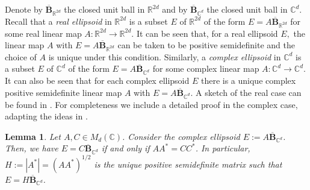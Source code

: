 \documentclass{article}
\newtheorem{lemma}[theorem]{Lemma}
\theoremstyle{definition}
\theoremstyle{remark}
\numberwithin{equation}{section}
\newcommand{\reals}{\mathbb{R}}
\newcommand{\complex}{\mathbb{C}}
\newcommand{\1}{\mathbf{1}}
\begin{document}
    Denote by $\mathbf{\overline{B}}_{\reals^{2d}}$ the closed unit ball in $\reals^{2d}$ and by $\mathbf{\overline{B}}_{\complex^{d}}$ the closed unit ball in $\complex^{d}.$
    Recall that a \emph{real ellipsoid} in $\reals^{2d}$ is a subset $E$ of $\reals^{2d}$ of the form $E=A\mathbf{\overline{B}}_{\reals^{2d}}$ for some real linear map $A:\reals^{2d}\to\reals^{2d}$.
    It can be seen that, for a real ellipsoid $E,$ the linear map $A$ with $E=A\mathbf{\overline{B}}_{\reals^{2d}}$ can be taken to be positive semidefinite and the choice of $A$ is unique under this condition.  Similarly, a \emph{complex ellipsoid} in $\complex^{d}$ is a subset $E$ of $\complex^{d}$ of the form $E=A\mathbf{\overline{B}}_{\complex^d}$ for some complex linear map $A:\complex^{d}\to\complex^{d}$. It can also be seen that for each complex ellipsoid $E$ there is a unique complex positive semidefinite linear map $A$ with $E=A\mathbf{\overline{B}}_{\complex^d}.$ A sketch of the real case can be found in \cite[page 304]{Goffin1983}. For completeness we include a detailed proof in the complex case, adapting the ideas in \cite[page 304]{Goffin1983}.

    \begin{lemma}
        \label{lem:matrix_ellipsoid}
        Let $A,C\in M_{d}(\complex)$. Consider the complex ellipsoid $E:=A\mathbf{\overline{B}}_{\complex^{d}}$. Then, we have $E=C\mathbf{\overline{B}}_{\complex^{d}}$ if and only if $AA^{\ast}=CC^{\ast}$. In particular, $H := |A^{\ast}| = (AA^{\ast})^{1/2}$ is the unique positive semidefinite matrix such that $E=H\mathbf{\overline{B}}_{\complex^d}$.
    \end{lemma}
\end{document}
